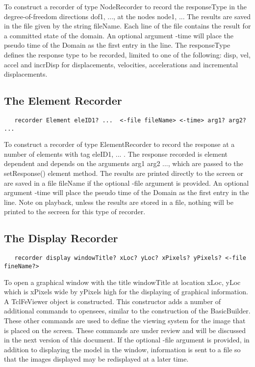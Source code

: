 \documentclass[12pt]{article}
\begin{document}
\noindent To construct a recorder of type NodeRecorder to record the 
responseType in the degree-of-freedom directions dof1, ..., at
the nodes node1, ... The results are saved in the file given
by the string fileName. Each line of the file contains the result for
a committed state of the domain. An optional argument -time will place
the pseudo time of the Domain as the first entry in the line. The
responseType defines the response type to be recorded, limited to one
of the following: disp, vel, accel and incrDisp for displacements,
velocities, accelerations and incremental displacements. 

\subsection{The Element Recorder}

{\sf\small
\begin{verbatim}
   recorder Element eleID1? ...  <-file fileName> <-time> arg1? arg2? ...
\end{verbatim}
}

\noindent To construct a recorder of type ElementRecorder to record
the response at a number of elements with tag eleID1, ... . The
response recorded is element dependent and depends on the arguments
arg1 arg2 ..., which are passed to the setResponse() element
method. The results are printed directly to the screen or are saved in
a file fileName if the optional -file argument is provided. An
optional argument -time will place the pseudo time of the Domain as
the first entry in the line. Note on playback, unless the results are
stored in a file, nothing will be printed to the secreen for this type
of recorder. 

\subsection{The Display Recorder}

{\sf\small
\begin{verbatim}
   recorder display windowTitle? xLoc? yLoc? xPixels? yPixels? <-file fineName?>
\end{verbatim}
}

\noindent To open a graphical window with the title windowTitle at location
xLoc, yLoc which is xPixels wide by yPixels high for the
displaying of graphical information. A TclFeViewer object is
constructed. This constructor adds a number of additional commands to
opensees, similar to the construction of the BasicBuilder. These other
commands are used to define the viewing system for the image that is
placed on the screen. These commands are under review and will be
discussed in the next version of this document. If the optional -file
argument is provided, in addition to displaying the model in the window,
information is sent to a file so that the images displayed may be
redisplayed at a later time. 
\end{document}

